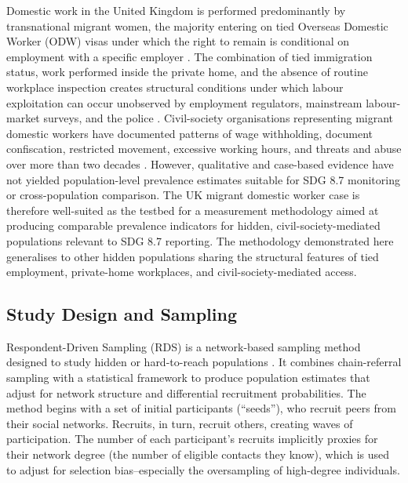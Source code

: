\documentclass[
  12pt,
  letterpaper,
  DIV=11,
  numbers=noendperiod]{scrartcl}
\begin{document}
Domestic work in the United Kingdom is performed predominantly by
transnational migrant women, the majority entering on tied Overseas
Domestic Worker (ODW) visas under which the right to remain is
conditional on employment with a specific employer
\autocite{mant16-modern,kala08-new,serv23-closed}. The combination of
tied immigration status, work performed inside the private home, and the
absence of routine workplace inspection creates structural conditions
under which labour exploitation can occur unobserved by employment
regulators, mainstream labour-market surveys, and the police
\autocite{romero_blueprint_2025}. Civil-society organisations
representing migrant domestic workers have documented patterns of wage
withholding, document confiscation, restricted movement, excessive
working hours, and threats and abuse over more than two decades
\autocite{kala08-new,mant16-modern,serv23-closed,yilm23-exploring}.
However, qualitative and case-based evidence have not yielded
population-level prevalence estimates suitable for SDG 8.7 monitoring or
cross-population comparison. The UK migrant domestic worker case is
therefore well-suited as the testbed for a measurement methodology aimed
at producing comparable prevalence indicators for hidden,
civil-society-mediated populations relevant to SDG 8.7 reporting. The
methodology demonstrated here generalises to other hidden populations
sharing the structural features of tied employment, private-home
workplaces, and civil-society-mediated access.

\subsection{Study Design and Sampling}\label{sec-study-design}

Respondent-Driven Sampling (RDS) is a network-based sampling method
designed to study hidden or hard-to-reach populations
\autocite{heck97-respondentdriven,heck11-comment,gile18-methods}. It
combines chain-referral sampling with a statistical framework to produce
population estimates that adjust for network structure and differential
recruitment probabilities. The method begins with a set of initial
participants (``seeds''), who recruit peers from their social networks.
Recruits, in turn, recruit others, creating waves of participation. The
number of each participant's recruits implicitly proxies for their
network degree (the number of eligible contacts they know), which is
used to adjust for selection bias--especially the oversampling of
high-degree individuals.
\end{document}
